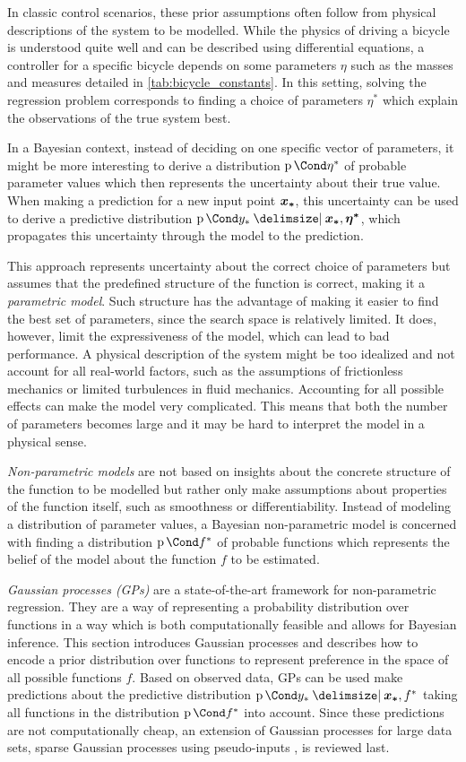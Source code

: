 In classic control scenarios, these prior assumptions often follow from physical descriptions of the system to be modelled.
While the physics of driving a bicycle is understood quite well and can be described using differential equations, a controller for a specific bicycle depends on some parameters $\eta$ such as the masses and measures detailed in \cref{tab:bicycle_constants}.
In this setting, solving the regression problem corresponds to finding a choice of parameters $\eta^\ast$ which explain the observations of the true system best.

In a Bayesian context, instead of deciding on one specific vector of parameters, it might be more interesting to derive a distribution $\Prob{\eta^*}$ of probable parameter values which then represents the uncertainty about their true value.
When making a prediction for a new input point $\bm{x_\ast}$, this uncertainty can be used to derive a predictive distribution $\Prob{y_\ast \given \mat{x_\ast}, \mat{\eta^\ast}}$, which propagates this uncertainty through the model to the prediction.

This approach represents uncertainty about the correct choice of parameters but assumes that the predefined structure of the function is correct, making it a \emph{parametric model}.
Such structure has the advantage of making it easier to find the best set of parameters, since the search space is relatively limited.
It does, however, limit the expressiveness of the model, which can lead to bad performance.
A physical description of the system might be too idealized and not account for all real-world factors, such as the assumptions of frictionless mechanics or limited turbulences in fluid mechanics.
Accounting for all possible effects can make the model very complicated.
This means that both the number of parameters becomes large and it may be hard to interpret the model in a physical sense.

\emph{Non-parametric models} are not based on insights about the concrete structure of the function to be modelled but rather only make assumptions about properties of the function itself, such as smoothness or differentiability.
Instead of modeling a distribution of parameter values, a Bayesian non-parametric model is concerned with finding a distribution $\Prob{f^\ast}$ of probable functions which represents the belief of the model about the function $f$ to be estimated.

\emph{Gaussian processes (GPs)} are a state-of-the-art framework for non-parametric regression.
They are a way of representing a probability distribution over functions in a way which is both computationally feasible and allows for Bayesian inference.
This section introduces Gaussian processes and describes how to encode a prior distribution over functions to represent preference in the space of all possible functions $f$.
Based on observed data, GPs can be used make predictions about the predictive distribution $\Prob{y_\ast \given \mat{x_\ast}, f^\ast}$ taking all functions in the distribution $\Prob{f^\ast}$ into account.
Since these predictions are not computationally cheap, an extension of Gaussian processes for large data sets, sparse Gaussian processes using pseudo-inputs \cite{snelson_sparse_2005}, is reviewed last.

